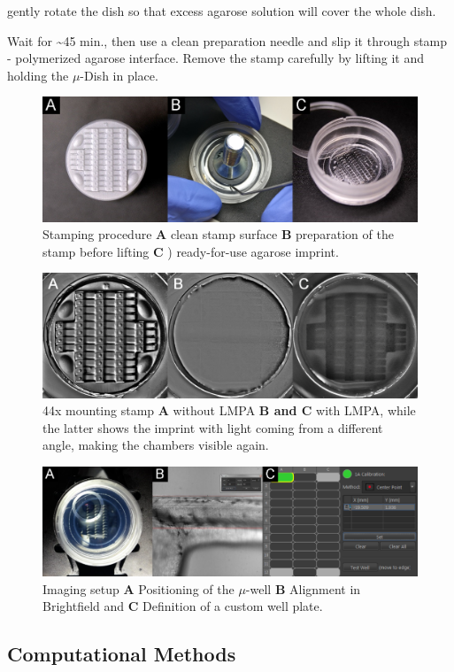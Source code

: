 \documentclass[11pt,singlespacinge,twoside]{reedthesis} %
\begin{document}
gently rotate the dish so that excess agarose solution will cover the whole dish.

Wait for \textasciitilde{}45 min., then use a clean preparation needle and slip it through stamp - polymerized agarose interface. Remove the stamp carefully by lifting it and holding the \(\mu\)-Dish in place.


\begin{figure}

{\centering \includegraphics[width=0.6\linewidth]{figure/02-MaMo/Mount/stampprod} 

}

\caption[Stamping procedure]{Stamping procedure \textbf{A} clean stamp surface \textbf{B} preparation of the stamp before lifting \textbf{C} ) ready-for-use agarose imprint.}\label{fig:stampprod}
\end{figure}

\begin{figure}

{\centering \includegraphics[width=0.6\linewidth]{figure/02-MaMo/Mount/mounting} 

}

\caption[44x mounting stamp]{44x mounting stamp \textbf{A} without LMPA \textbf{B and C} with LMPA, while the latter shows the imprint with light coming from a different angle, making the chambers visible again.}\label{fig:mounting}
\end{figure}

\begin{figure}

{\centering \includegraphics[width=0.6\linewidth]{figure/02-MaMo/Mount/setup} 

}

\caption[Imaging setup]{Imaging setup \textbf{A} Positioning of the \(\mu\)-well \textbf{B} Alignment in Brightfield and \textbf{C} Definition of a custom well plate.}\label{fig:setup}
\end{figure}
\hypertarget{comp-met}{%
\subsection{Computational Methods}\label{comp-met}}
\end{document}
